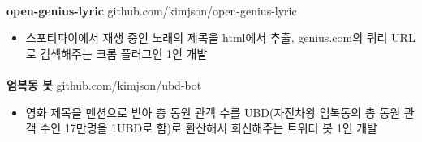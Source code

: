 \documentclass{article}
\begin{document}
\paragraph{}
\textbf{open-genius-lyric} \hfill github.com/kimjson/open-genius-lyric
\begin{itemize}
    \setlength\itemsep{0.1em}
    \item 스포티파이에서 재생 중인 노래의 제목을 html에서 추출, genius.com의 쿼리 URL로 검색해주는 크롬 플러그인 1인 개발
\end{itemize}
\paragraph{}
\textbf{엄복동 봇} \hfill github.com/kimjson/ubd-bot
\begin{itemize}
    \setlength\itemsep{0.1em}
    \item 영화 제목을 멘션으로 받아 총 동원 관객 수를 UBD(자전차왕 엄복동의 총 동원 관객 수인 17만명을 1UBD로 함)로 환산해서 회신해주는 트위터 봇 1인 개발
\end{itemize}
\end{document}
